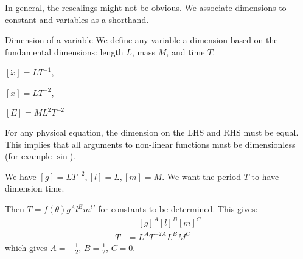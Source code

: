 \documentclass[../Main.tex]{subfiles}
\begin{document}
In general, the rescalings might not be obvious. We associate dimensions to constant and variables as a shorthand.\par
\begin{definition}{Dimension of a variable}
    We define any variable a \underline{dimension} based on the fundamental dimensions: length $L$, mass $M$, and time $T$.
\end{definition}
\begin{examples}{}
    \item $[\dot{x}] = LT^{-1}$,
    \item $[\ddot{x}] = LT^{-2}$,
    \item $[E] = ML^2 T^{-2}$
\end{examples}
For any physical equation, the dimension on the LHS and RHS must be equal. This implies that all arguments to non-linear functions must be dimensionless (for example $\sin$).
\begin{example}
    We have $[g] = LT^{-2}, [l] = L, [m] = M$. We want the period $T$ to have dimension time.\par
    Then $T = f(\theta) g^A l^B m^C$ for constants to be determined. This gives:
    \begin{align*}
        [T] &= [g]^A[l]^B[m]^C \\
        T &= L^A T^{-2A} L^B M^C
    \end{align*}
    which gives $A = -\frac{1}{2}$, $B = \frac{1}{2}$, $C = 0$.
\end{example}
\end{document}
